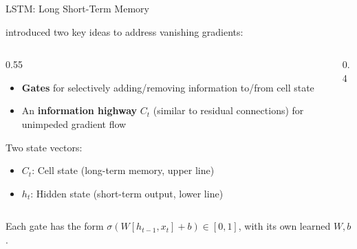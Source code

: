 \begin{frame}{LSTM: Long Short-Term Memory}

  \cite{hochreiter1997lstm} introduced two key ideas to address vanishing gradients:

  \begin{columns}
    \begin{column}{0.55\textwidth}
      \begin{itemize}
        \item \textbf{Gates} for selectively adding/removing information to/from cell state
        \item An \textbf{information highway} $C_t$ (similar to residual connections) for unimpeded gradient flow
      \end{itemize}

      \vspace{0.3em}
      Two state vectors:
      \begin{itemize}
        \item $C_t$: Cell state (long-term memory, upper line)
        \item $h_t$: Hidden state (short-term output, lower line)
      \end{itemize}
    \end{column}
    \begin{column}{0.4\textwidth}
      \begin{center}
      \end{center}
    \end{column}
  \end{columns}

  \vspace{0.3em}
  Each gate has the form $\sigma\!\left(W [h_{t-1}, x_t] + b\right) \in [0,1]$, with its own learned $W, b$.
\end{frame}

